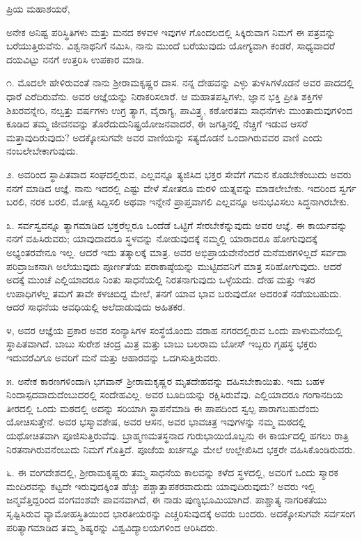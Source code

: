 \noindent
ಪ್ರಿಯ ಮಹಾಶಯರೆ,

ಅನೇಕ ಅನಿಷ್ಟ ಪರಿಸ್ಥಿತಿಗಳು ಮತ್ತು ಮನದ ಕಳವಳ ಇವುಗಳ ಗೊಂದಲದಲ್ಲಿ ಸಿಕ್ಕಿರುವಾಗ ನಿಮಗೆ ಈ ಪತ್ರವನ್ನು ಬರೆಯುತ್ತಿರುವೆನು. ವಿಶ್ವನಾಥನಿಗೆ ನಮಿಸಿ, ನಾನು ಮುಂದೆ ಬರೆಯುವುದು ಯೋಗ್ಯವಾಗಿ ಕಂಡರೆ, ಸಾಧ್ಯವಾದರೆ ದಯವಿಟ್ಟು ನನಗೆ ಉತ್ತರಿಸಿ ಉಪಕಾರ ಮಾಡಿ.

೧. ಮೊದಲೇ ಹೇಳಿರುವಂತೆ ನಾನು ಶ‍್ರೀರಾಮಕೃಷ್ಣರ ದಾಸ. ನನ್ನ ದೇಹವನ್ನು ಎಳ್ಳು ತುಳಸಿಗಳೊಡನೆ ಅವರ ಪಾದದಲ್ಲಿ ಧಾರೆ ಎರೆದಿರುವೆನು. ಅವರ ಆಜ್ಞೆಯನ್ನು ನಿರಾಕರಿಸಲಾರೆ. ಆ ಮಹಾತಪಸ್ವಿಗಳು, ಜ್ಞಾನ ಭಕ್ತಿ ಪ್ರೀತಿ ಶಕ್ತಿಗಳ ಶಿಖರವನ್ನೇರಿ, ನಲ್ವತ್ತು ವರ್ಷಗಳು ಉಗ್ರ ತ್ಯಾಗ, ವೈರಾಗ್ಯ, ಪಾವಿತ್ರ್ಯ, ಕಠೋರತಮ ಸಾಧನೆಗಳು ಮುಂತಾದುವುಗಳಿಂದ ಕೂಡಿದ ತಮ್ಮ ಜೀವನವನ್ನು ತೊರೆದುದುನಿಷ್ಪ್ರಯೋಜನವಾದರೆ, ಈ ಜಗತ್ತಿನಲ್ಲಿ ನೆಚ್ಚಿಗೆ ಇಡುವ ಆಸರೆ ಮತ್ತಾವುದಿರುವುದು? ಅದಕ್ಕೋಸುಗವೇ ಅವರ ವಾಣಿಯನ್ನು ಸತ್ಯದೊಡನೆ ಒಂದಾಗಿರುವವರ ವಾಣಿ ಎಂದು ನಂಬಲೇಬೇಕಾಗುವುದು.

೨. ಅವರಿಂದ ಸ್ಥಾಪಿತವಾದ ಸಂಘದಲ್ಲಿರುವ, ಎಲ್ಲವನ್ನೂ ತ್ಯಜಿಸಿದ ಭಕ್ತರ ಸೇವೆಗೆ ಗಮನ ಕೊಡಬೇಕೆಂಬುದು ಅವರು ನನಗೆ ಮಾಡಿದ ಆಜ್ಞೆ. ನಾನು ಇದರಲ್ಲಿ ಎಷ್ಟು ವೇಳೆ ಸೋತರೂ ಮರಳಿ ಯತ್ನವನ್ನು ಮಾಡಲೇಬೇಕು. ಇದರಿಂದ ಸ್ವರ್ಗ ಬರಲಿ, ನರಕ ಬರಲಿ, ಮೋಕ್ಷ ಸಿದ್ದಿಸಲಿ ಅಥವಾ ಇನ್ನೇನೆ ಪ್ರಾಪ್ತವಾಗಲಿ ಎಲ್ಲವನ್ನೂ ಅನುಭವಿಸಲು ಸಿದ್ಧನಾಗಿರಬೇಕು.

೩. ಸರ್ವಸ್ವವನ್ನೂ ತ್ಯಾಗಮಾಡಿದ ಭಕ್ತರೆಲ್ಲರೂ ಒಂದೆಡೆ ಒಟ್ಟಿಗೆ ಸೇರಬೇಕೆನ್ನುವುದು ಅವರ ಆಜ್ಞೆ. ಈ ಕಾರ್ಯವನ್ನು ನನಗೆ ವಹಿಸಿರುವರು; ಯಾವುದಾದರೂ ಸ್ಥಳವನ್ನು ನೋಡುವುದಕ್ಕೆ ನಮ್ಮಲ್ಲಿ ಯಾರಾದರೂ ಹೋಗುವುದಕ್ಕೆ ಅಭ್ಯಂತರವೇನೂ ಇಲ್ಲ. ಆದರೆ ಇದು ತತ್ಕಾಲಕ್ಕೆ ಮಾತ್ರ. ಅವರ ಅಭಿಪ್ರಾಯವೇನೆಂದರೆ ಮನೆಮಠಗಳಿಲ್ಲದೆ ಸರ್ವದಾ ಪರಿವ್ರಾಜಕನಾಗಿ ಅಲೆಯುವುದು ಪೂರ್ಣತೆಯ ಪರಾಕಾಷ್ಠೆಯನ್ನು ಮುಟ್ಟಿದವನಿಗೆ ಮಾತ್ರ ಸರಿಹೋಗುವುದು. ಆದರೆ ಅದಕ್ಕೆ ಮುಂಚೆ ಎಲ್ಲಿಯಾದರೂ ನಿಂತು ಸಾಧನೆಯಲ್ಲಿ ನಿರತನಾಗುವುದು ಒಳ್ಳೆಯದು. ದೇಹ ಮತ್ತು ಇತರ ಉಪಾಧಿಗಳೆಲ್ಲ ತಮಗೆ ತಾವೇ ಕಳಚಿಬಿದ್ದ ಮೇಲೆ, ತನಗೆ ಯಾವ ಭಾವ ಬರುವುದೋ ಅದರಂತೆ ನಡೆಯಬಹುದು. ಆದರೆ ಸಾಧನೆಯ ಅವಧಿಯಲ್ಲಿ ಅಲೆದಾಡುವುದು ಅಹಿತಕರ.

೪, ಅವರ ಆಜ್ಞೆಯ ಪ್ರಕಾರ ಅವರ ಸಂನ್ಯಾಸಿಗಳ ಸಂಸ್ಥೆಯೊಂದು ವರಾಹ ನಗರದಲ್ಲಿರುವ ಒಂದು ಪಾಳುಮನೆಯಲ್ಲಿ ಸ್ಥಾಪಿತವಾಗಿದೆ. ಬಾಬು ಸುರೇಶ ಚಂದ್ರ ಮಿತ್ರ ಮತ್ತು ಬಾಬು ಬಲರಾಮ ಬೋಸ್ ಇಬ್ಬರು ಗೃಹಸ್ಥ ಭಕ್ತರು ಇದುವರೆವಿಗೂ ಅವರಿಗೆ ಮನೆ ಮತ್ತು ಆಹಾರವನ್ನು ಒದಗಿಸುತ್ತಿರುವರು.

೫. ಅನೇಕ ಕಾರಣಗಳಿಂದಾಗಿ ಭಗವಾನ್ ಶ‍್ರೀರಾಮಕೃಷ್ಣರ ಮೃತದೇಹವನ್ನು ದಹಿಸಬೇಕಾಯಿತು. ಇದು ಬಹಳ ನಿಂದಾಸ್ಪದವಾದುದೆಂಬುದರಲ್ಲಿ ಸಂದೇಹವಿಲ್ಲ. ಅವರ ಬೂದಿಯನ್ನು ರಕ್ಷಿಸಿರುವೆವು. ಎಲ್ಲಿಯಾದರೂ ಗಂಗಾನದಿಯ ತೀರದಲ್ಲಿ ಒಂದು ಮಠದಲ್ಲಿ ಅದನ್ನು ಸರಿಯಾಗಿ ಸ್ಥಾಪನೆಮಾಡಿ ಈ ಪಾಪದಿಂದ ಸ್ವಲ್ಪ ಪಾರಾಗಬಹುದೆಂದು ಯೋಚಿಸುತ್ತೇನೆ. ಅವರ ಭಸ್ಮಾವಶೇಷ, ಅವರ ಆಸನ, ಅವರ ಭಾವಚಿತ್ರ ಇವುಗಳನ್ನು ನಮ್ಮ ಮಠದಲ್ಲಿ ಯಥೋಚಿತವಾಗಿ ಪೂಜಿಸುತ್ತಿರುವೆವು. ಬ್ರಾಹ್ಮಣಮತಸ್ಥನಾದ ಗುರುಭಾಯಿಯೊಬ್ಬನು ಈ ಕಾರ್ಯದಲ್ಲಿ ಹಗಲು ರಾತ್ರಿ ನಿರತನಾಗಿರುವನೆಂಬುದು ನಿಮಗೆ ಗೊತ್ತಿದೆ. ಪೂಜೆಯ ಖರ್ಚನ್ನೂ ಮೇಲೆ ಉಲ್ಲೇಖಿಸಿದ ಭಕ್ತರೇ ವಹಿಸಿಕೊಂಡಿರುವರು.

೬. ಈ ವಂಗದೇಶದಲ್ಲಿ, ಶ‍್ರೀರಾಮಕೃಷ್ಣರು ತಮ್ಮ ಸಾಧನೆಯ ಕಾಲವನ್ನು ಕಳೆದ ಸ್ಥಳದಲ್ಲಿ, ಅವರಿಗೆ ಒಂದು ಸ್ಮಾರಕ ಮಂದಿರವನ್ನು ಕಟ್ಟದೇ ಇರುವುದಕ್ಕಿಂತ ಹೆಚ್ಚು ಪಶ್ಚಾತ್ತಾಪಕರವಾದುದು ಯಾವುದಿರುವುದು? ಅವರು ಇಲ್ಲಿ ಜನ್ಮವೆತ್ತಿದ್ದರಿಂದ ವಂಗವಂಶವೇ ಪಾವನವಾಗಿದೆ, ಈ ನಾಡು ಪುಣ್ಯಭೂಮಿಯಾಗಿದೆ. ಪಾಶ್ಚಾತ್ಯ ನಾಗರಿಕತೆಯು ಸೃಷ್ಟಿಸಿರುವ ವ್ಯಾಮೋಹಸ್ಥಿತಿಯಿಂದ ಭಾರತೀಯರನ್ನು ಎಚ್ಚರಿಸುವುದಕ್ಕೆ ಅವರು ಬಂದರು. ಅದಕ್ಕೋಸುಗವೇ ಸರ್ವಸಂಗ ಪರಿತ್ಯಾಗಮಾಡಿದ ತಮ್ಮ ಶಿಷ್ಯರನ್ನು ವಿಶ್ವವಿದ್ಯಾಲಯಗಳಿಂದ ಆರಿಸಿದರು.

